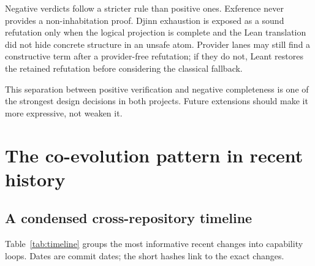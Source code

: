 \documentclass[11pt]{article}
\newcommand{\Leant}{\textsf{Leant}}
\newcommand{\Djinn}{Djinn}
\newcommand{\Exference}{Exference}
\begin{document}
Negative verdicts follow a stricter rule than positive ones.  \Exference{}
never provides a non-inhabitation proof.  \Djinn{} exhaustion is exposed as a
sound refutation only when the logical projection is complete and the Lean
translation did not hide concrete structure in an unsafe atom.  Provider lanes
may still find a constructive term after a provider-free refutation; if they do
not, \Leant{} restores the retained refutation before considering the classical
fallback.

This separation between positive verification and negative completeness is one
of the strongest design decisions in both projects.  Future extensions should
make it more expressive, not weaken it.

\section{The co-evolution pattern in recent history}

\subsection{A condensed cross-repository timeline}

Table~\ref{tab:timeline} groups the most informative recent changes into
capability loops.  Dates are commit dates; the short hashes link to the exact
changes.
\end{document}
